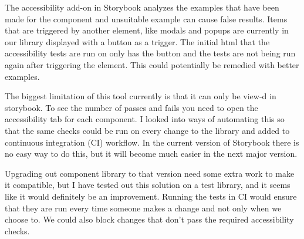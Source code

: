 \documentclass{master_thesis}
\begin{document}
The accessibility add-on in Storybook analyzes the examples that have been made for the component and unsuitable example can cause false results. Items that are triggered by another element, like modals and popups are currently in our library displayed with a button as a trigger. The initial html that the accessibility tests are run on only has the button and the tests are not being run again after triggering the element. This could potentially be remedied with better examples.

The biggest limitation of this tool currently is that it can only be view-d in storybook. To see the number of passes and fails you need to open the accessibility tab for each component. I looked into ways of automating this so that the same checks could be run on every change to the library and added to continuous integration (CI) workflow. In the current version of Storybook there is no easy way to do this, but it will become much easier in the next major version.

Upgrading out component library to that version need some extra work to make it compatible, but I have tested out this solution on a test library, and it seems like it would definitely be an improvement. Running the tests in CI would ensure that they are run every time someone makes a change and not only when we choose to. We could also block changes that don't pass the required accessibility checks.

\end{document}
